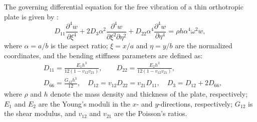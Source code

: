 \documentclass[preprint,12pt]{elsarticle}
\begin{document}
The governing differential equation for the free vibration of a thin orthotropic plate is given by \citep{xing2020improved}:  
%
\begin{equation}\label{eq:governing_EOM}
	D_{11}\frac{\partial^4w}{\partial \xi^4} + 2D_3\alpha^2\frac{\partial^4w}{\partial \xi^2 \partial \eta^2} + D_{22}\alpha^4\frac{\partial^4w}{\partial \eta^4} = \rho h\alpha^4\omega^2w,
\end{equation}
%
where $ \alpha = a / b $ is the aspect ratio; $ \xi = x / a $ and $ \eta = y / b $ are the normalized coordinates, and the bending stiffness parameters are defined as:
%
\begin{equation}\label{eq:bd_stiff}
	\begin{split}
		&D_{11} = \frac{E_1h^3}{12(1-v_{12}v_{21})}, \qquad D_{22} = \frac{E_2h^3}{12(1-v_{12}v_{21})}, \\  
		&D_{66} = \frac{G_{12}h^3}{12}, \quad D_{12} = v_{12}D_{22} = v_{21}D_{11}, \quad D_3 = D_{12} + 2D_{66},
	\end{split}
\end{equation}
%
where $\rho$ and $h$ denote the mass density and thickness of the plate, respectively; $E_1$ and $E_2$ are the Young’s moduli in the $x$- and $y$-directions, respectively; $G_{12}$ is the shear modulus, and $v_{12}$ and $v_{21}$ are the Poisson’s ratios.
\end{document}
